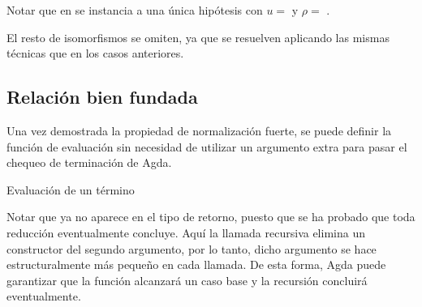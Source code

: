 
Notar que en  se instancia a una única hipótesis  con $u =$  y $\rho =$ .


El resto de isomorfismos se omiten, ya que se resuelven aplicando las mismas técnicas que en los casos anteriores.






\subsection{Relación bien fundada}

Una vez demostrada la propiedad de normalización fuerte, se puede definir la función de evaluación sin necesidad de utilizar un argumento extra para pasar el chequeo de terminación de Agda.
  
\begin{codigo}
	Evaluación de un término
\end{codigo}

Notar que ya no aparece  en el tipo de retorno, puesto que se ha probado que toda reducción eventualmente concluye.
Aquí la llamada recursiva elimina un constructor  del segundo argumento, por lo tanto, dicho argumento se hace estructuralmente más pequeño en cada llamada.
De esta forma, Agda puede garantizar que la función alcanzará un caso base y la recursión concluirá eventualmente.


